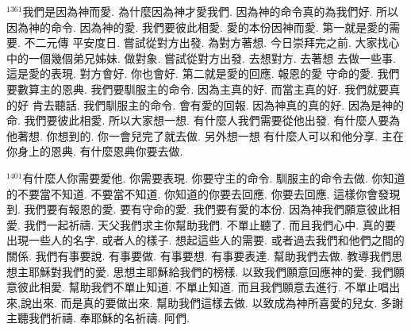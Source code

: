 \documentclass{book}
\begin{document}
$^{1361}$我們是因為神而愛.
為什麼因為神才愛我們.
因為神的命令真的為我們好.
所以因為神的命令.
因為神的愛.
我們要彼此相愛.
愛的本份因神而愛.
第一就是愛的需要.
不二元傳 平安度日.
嘗試從對方出發.
為對方著想.
今日崇拜完之前.
大家找心中的一個幾個弟兄姊妹.
做對象.
嘗試從對方出發.
去想對方.
去著想 去做一些事.
這是愛的表現.
對方會好.
你也會好.
第二就是愛的回應.
報恩的愛 守命的愛.
我們要數算主的恩典.
我們要馴服主的命令.
因為主真的好.
而當主真的好.
我們就要真的好 肯去聽話.
我們馴服主的命令.
會有愛的回報.
因為神真的真的好.
因為是神的命.
我們要彼此相愛.
所以大家想一想.
有什麼人我們需要從他出發.
有什麼人要為他著想.
你想到的.
你一會兒完了就去做.
另外想一想 有什麼人可以和他分享.
主在你身上的恩典.
有什麼恩典你要去做.

$^{1401}$有什麼人你需要愛他.
你需要表現.
你要守主的命令.
馴服主的命令去做.
你知道的不要當不知道.
不要當不知道.
你知道的你要去回應.
你要去回應.
這樣你會發現到.
我們要有報恩的愛.
要有守命的愛.
我們要有愛的本份.
因為神我們願意彼此相愛.
我們一起祈禱.
天父我們求主你幫助我們.
不單止聽了.
而且我們心中.
真的要出現一些人的名字.
或者人的樣子.
想起這些人的需要.
或者過去我們和他們之間的關係.
我們有事要說.
有事要做.
有事要想.
有事要表達.
幫助我們去做.
教導我們思想主耶穌對我們的愛.
思想主耶穌給我們的榜樣.
以致我們願意回應神的愛.
我們願意彼此相愛.
幫助我們不單止知道.
不單止知道.
而且我們願意去進行.
不單止唱出來,說出來.
而是真的要做出來.
幫助我們這樣去做.
以致成為神所喜愛的兒女.
多謝主聽我們祈禱.
奉耶穌的名祈禱.
阿們.

\newpage
\end{document}
